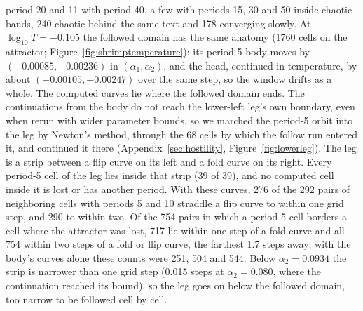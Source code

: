 \documentclass[11pt,letterpaper]{article}
\begin{document}
period 20 and 11 with period 40, a few with periods 15, 30 and 50 inside chaotic bands, 240 chaotic behind the same
text and 178 converging slowly. At $\log_{10}T=-0.105$ the followed domain has the same anatomy (1760 cells on the
attractor; Figure~\ref{fig:shrimptemperature}): its period-5 body moves by $(+0.00085,+0.00236)$ in
$(\alpha_1,\alpha_2)$, and the head, continued in temperature, by about $(+0.00105,+0.00247)$ over the same step, so the
window drifts as a whole. The computed curves lie where the followed domain ends. The continuations from the body do
not reach the lower-left leg's own boundary, even when rerun with wider parameter bounds, so we marched the period-5
orbit into the leg by Newton's method, through the 68 cells by which the follow run entered it, and continued it there
(Appendix~\ref{sec:hostility}, Figure~\ref{fig:lowerleg}). The leg is a strip between a flip curve on its left and a
fold curve on its right. Every period-5 cell of the leg lies inside that strip (39 of 39), and no computed cell inside
it is lost or has another period. With these curves, 276 of the 292 pairs of neighboring cells with periods 5 and 10
straddle a flip curve to within one grid step, and 290 to within two. Of the 754 pairs in which a period-5 cell borders
a cell where the attractor was lost, 717 lie within one step of a fold curve and all 754 within two steps of a fold or
flip curve, the farthest 1.7 steps away; with the body's curves alone these counts were 251, 504 and 544. Below
$\alpha_2=0.0934$ the strip is narrower than one grid step (0.015 steps at $\alpha_2=0.080$, where the continuation
reached its bound), so the leg goes on below the followed domain, too narrow to be followed cell by cell.
\end{document}
